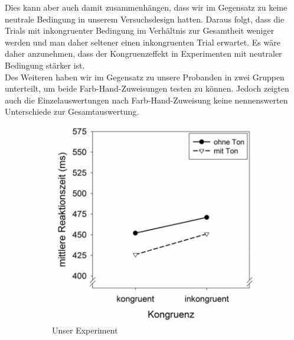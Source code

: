 Dies kann aber auch damit zusammenhängen, dass wir im Gegensatz zu  keine neutrale Bedingung in unserem Versuchsdesign hatten. Daraus folgt, dass die Trials mit inkongruenter Bedingung im Verhältnis zur Gesamtheit weniger werden und man daher seltener einen inkongruenten Trial erwartet. Es wäre daher anzunehmen, dass der Kongruenzeffekt in Experimenten mit neutraler Bedingung stärker ist.\\
Des Weiteren haben wir im Gegensatz zu  unsere Probanden in zwei Gruppen unterteilt, um beide Farb-Hand-Zuweisungen testen zu können. Jedoch zeigten auch die Einzelauswertungen nach Farb-Hand-Zuweisung keine nennenswerten Unterschiede zur Gesamtauswertung.\\
\begin{figure}[t]
	\centering
		\begin{subfigure}[b]{0.49\textwidth}
	       \includegraphics[width=\textwidth]{grafiken/Vergleich-unser.png}
	       \caption{Unser Experiment}
	       \label{fig:exp1}
	    \end{subfigure}%
	       ~
	    \begin{subfigure}[b]{0.49\textwidth}

\end{subfigure}
\end{figure}
